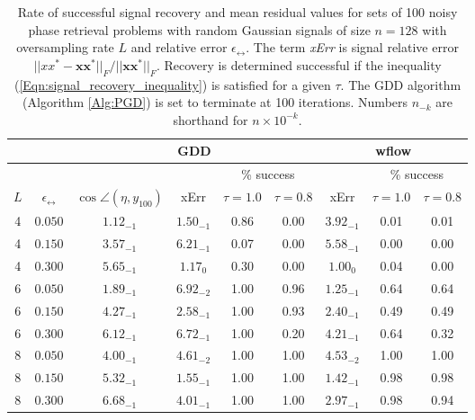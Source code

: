\begin{table}[H]
\centering
\begin{tabular}{ |cc|c|c|cc|c|cc| }
\hline
	\multicolumn{2}{|c|}{}
	&	\multicolumn{4}{c|}{GDD} 	
		&	\multicolumn{3}{c|}{wflow} 	  \\
 \hline
 	&&&&	\multicolumn{2}{c|}{\% success}
 				&&	\multicolumn{2}{c|}{\% success}	\\
$L$	&	$\epsilon_\rel$ 	&	$\cos \angle (\eta, y_{100})$ &  xErr &	$\tau= 1.0$ & $\tau= 0.8$	 & xErr &	$\tau= 1.0$ & $\tau= 0.8$	 \\
\hline
  4 & $0.050$ & $1.12_{-1}$ & $1.50_{-1}$ &  0.86 & 0.00 & $3.92_{-1}$ & 0.01 & 0.01	\\
  4 & $0.150$ & $3.57_{-1}$ & $6.21_{-1}$ &  0.07 & 0.00 & $5.58_{-1}$ & 0.00 & 0.00	\\
   4 & $0.300$ & $5.65_{-1}$ & $1.17_{0}$ &  0.30 & 0.00 & $1.00_{0}$ & 0.04 & 0.00	\\
\hline
  6 & $0.050$ & $1.89_{-1}$ & $6.92_{-2}$ &  1.00 & 0.96 & $1.25_{-1}$ & 0.64 & 0.64	\\
  6 & $0.150$ & $4.27_{-1}$ & $2.58_{-1}$ &  1.00 & 0.93 & $2.40_{-1}$ & 0.49 & 0.49	\\
  6 & $0.300$ & $6.12_{-1}$ & $6.72_{-1}$ &  1.00 & 0.20 & $4.21_{-1}$ & 0.64 & 0.32	\\
\hline
  8 & $0.050$ & $4.00_{-1}$ & $4.61_{-2}$ &  1.00 & 1.00 & $4.53_{-2}$ & 1.00 & 1.00	\\
  8 & $0.150$ & $5.32_{-1}$ & $1.55_{-1}$ &  1.00 & 1.00 & $1.42_{-1}$ & 0.98 & 0.98	\\
  8 & $0.300$ & $6.68_{-1}$ & $4.01_{-1}$ &  1.00 & 1.00 & $2.97_{-1}$ & 0.98 & 0.94	\\
\hline

\end{tabular}
\vspace{0.5cm}
\caption{Rate of successful signal recovery and mean residual values for sets of 100 noisy phase retrieval problems with random Gaussian signals of size $n = 128$ with oversampling rate $L$ and relative error $\epsilon_\rel$.  The term \textit{xErr} is signal relative error $||xx^*- \mathbf{x}\mathbf{x}^*||_F / ||\mathbf{x}\mathbf{x}^*||_F$.  Recovery is determined successful if the inequality (\ref{Eqn:signal_recovery_inequality}) is satisfied for a given $\tau$.  The GDD algorithm (Algorithm \ref{Alg:PGD}) is set to terminate at 100 iterations. Numbers $n_{-k}$ are shorthand for $n \times 10^{-k}$.} \label{Tab:relative_errors_saga_vs_wflow}
\end{table}  


